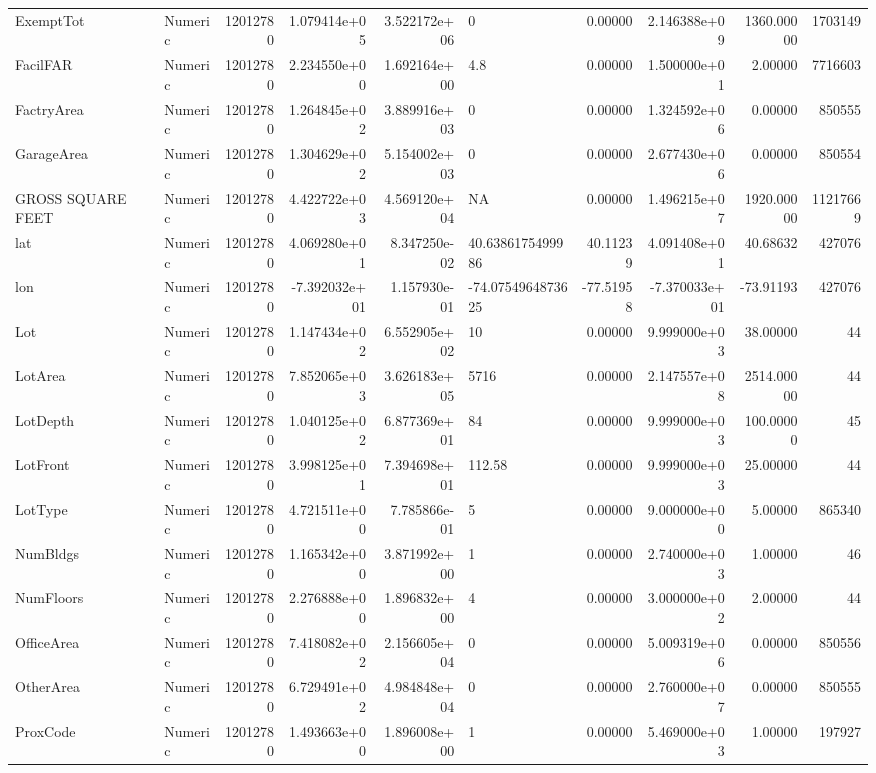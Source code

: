 \documentclass[12pt,]{article}
\begin{document}
\begin{table}
{\begin{tabular}[t]{llrrrlrrrr}
\addlinespace
ExemptTot & Numeric & 12012780 & 1.079414e+05 & 3.522172e+06 & 0 & 0.00000 & 2.146388e+09 & 1360.00000 & 1703149\\
FacilFAR & Numeric & 12012780 & 2.234550e+00 & 1.692164e+00 & 4.8 & 0.00000 & 1.500000e+01 & 2.00000 & 7716603\\
FactryArea & Numeric & 12012780 & 1.264845e+02 & 3.889916e+03 & 0 & 0.00000 & 1.324592e+06 & 0.00000 & 850555\\
GarageArea & Numeric & 12012780 & 1.304629e+02 & 5.154002e+03 & 0 & 0.00000 & 2.677430e+06 & 0.00000 & 850554\\
GROSS SQUARE FEET & Numeric & 12012780 & 4.422722e+03 & 4.569120e+04 & NA & 0.00000 & 1.496215e+07 & 1920.00000 & 11217669\\
\addlinespace
lat & Numeric & 12012780 & 4.069280e+01 & 8.347250e-02 & 40.6386175499986 & 40.11239 & 4.091408e+01 & 40.68632 & 427076\\
lon & Numeric & 12012780 & -7.392032e+01 & 1.157930e-01 & -74.0754964873625 & -77.51958 & -7.370033e+01 & -73.91193 & 427076\\
Lot & Numeric & 12012780 & 1.147434e+02 & 6.552905e+02 & 10 & 0.00000 & 9.999000e+03 & 38.00000 & 44\\
LotArea & Numeric & 12012780 & 7.852065e+03 & 3.626183e+05 & 5716 & 0.00000 & 2.147557e+08 & 2514.00000 & 44\\
LotDepth & Numeric & 12012780 & 1.040125e+02 & 6.877369e+01 & 84 & 0.00000 & 9.999000e+03 & 100.00000 & 45\\
\addlinespace
LotFront & Numeric & 12012780 & 3.998125e+01 & 7.394698e+01 & 112.58 & 0.00000 & 9.999000e+03 & 25.00000 & 44\\
LotType & Numeric & 12012780 & 4.721511e+00 & 7.785866e-01 & 5 & 0.00000 & 9.000000e+00 & 5.00000 & 865340\\
NumBldgs & Numeric & 12012780 & 1.165342e+00 & 3.871992e+00 & 1 & 0.00000 & 2.740000e+03 & 1.00000 & 46\\
NumFloors & Numeric & 12012780 & 2.276888e+00 & 1.896832e+00 & 4 & 0.00000 & 3.000000e+02 & 2.00000 & 44\\
OfficeArea & Numeric & 12012780 & 7.418082e+02 & 2.156605e+04 & 0 & 0.00000 & 5.009319e+06 & 0.00000 & 850556\\
\addlinespace
OtherArea & Numeric & 12012780 & 6.729491e+02 & 4.984848e+04 & 0 & 0.00000 & 2.760000e+07 & 0.00000 & 850555\\
ProxCode & Numeric & 12012780 & 1.493663e+00 & 1.896008e+00 & 1 & 0.00000 & 5.469000e+03 & 1.00000 & 197927\\

\end{tabular}}
\end{table}
\end{document}
